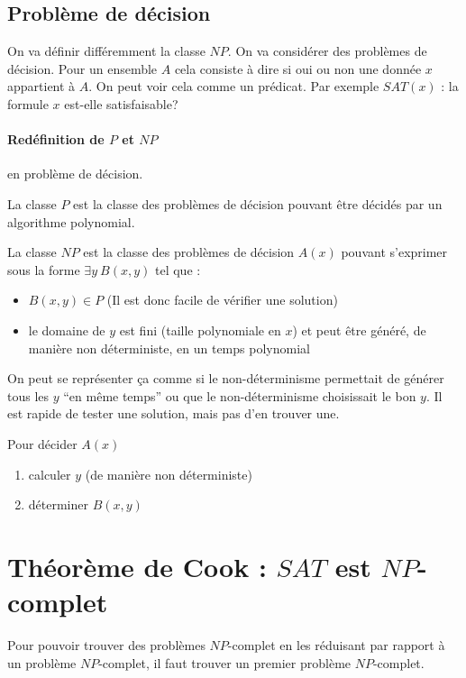 \subsection{Problème de décision}
On va définir différemment la classe $NP$. On va considérer des problèmes de
décision. Pour un ensemble $A$ cela consiste à dire si oui ou non une donnée $x$
appartient à $A$. On peut voir cela comme un prédicat. Par exemple $SAT(x)$ : la
formule $x$ est-elle satisfaisable?

\paragraph{Redéfinition de $P$ et $NP$} en problème de décision.

\begin{mydef}[Classe $P$]
	La classe $P$ est la classe des problèmes de décision pouvant être
	décidés par un algorithme polynomial.
\end{mydef}

\begin{mydef}[Classe $NP$]
	La classe $NP$ est la classe des problèmes de décision $A(x)$ pouvant
	s'exprimer sous la forme $\exists y \ B(x,y)$ tel que :
	\begin{itemize}
		\item $B(x,y) \in P$ (Il est donc facile de vérifier une
			solution)
		\item le domaine de $y$ est fini (taille polynomiale en $x$)
		       	et peut être généré, de manière non déterministe, en
			un temps polynomial
	\end{itemize}
\end{mydef}

\begin{myrem}
	On peut se représenter ça comme si le non-déterminisme permettait
       	de générer tous les $y$ ``en même temps'' ou
	que le non-déterminisme choisissait le bon $y$.
	Il est rapide de tester une solution, mais pas d'en trouver une.
\end{myrem}

\begin{mydef}
	Pour décider $A(x)$
	\begin{enumerate}
		\item calculer $y$ (de manière non déterministe)
		\item déterminer $B(x,y)$
	\end{enumerate}
\end{mydef}

\section{Théorème de Cook : $SAT$ est $NP$-complet}
Pour pouvoir trouver des problèmes $NP$-complet en les réduisant par rapport à
un problème $NP$-complet, il faut trouver un premier problème $NP$-complet.
